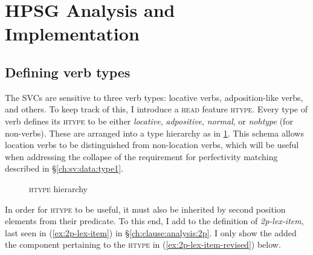 \section{HPSG Analysis and Implementation} \label{ch:sv:analysis}

\subsection{Defining verb types} \label{ch:sv:analysis:htype}

The SVCs are sensitive to three verb types: locative verbs, adposition-like verbs, and others. To keep track of this, I introduce a \textsc{head} feature \textsc{htype}. Every type of verb defines its \textsc{htype} to be either \textit{locative}, \textit{adpositive}, \textit{normal}, or \textit{nohtype} (for non-verbs). These are arranged into a type hierarchy as in \cref{figure:htypehierarchy}. This schema allows location verbs to be distinguished from non-location verbs, which will be useful when addressing the collapse of the requirement for perfectivity matching described in \S\ref{ch:sv:data:type1}.

\begin{figure}[H]
\begin{center}
\caption{\textsc{htype} hierarchy}
\label{figure:htypehierarchy}
\end{center}
\end{figure}

In order for \textsc{htype} to be useful, it must also be inherited by second position elements from their predicate. To this end, I add to the definition of {\textit{2p-lex-item}}, last seen in (\ref{ex:2p-lex-item}) in \S\ref{ch:clause:analysis:2p}. I only show the added the component pertaining to the \textsc{htype} in (\ref{ex:2p-lex-item-revised}) below.

